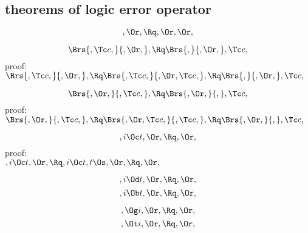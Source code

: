 \subsection{theorems of logic error operator}

\[, \Or, \Rq , \Or, \Or,\]


\[\Brs{,\Tc c,}{,\Or,} , \Rq \Brs{,}{,\Or,},\Tc c,\]
\bigskip
proof:\\
\begin{math} 
 \Brs{,\Tc c,}{,\Or,} ,\\\\
\Rq \Brs{,\Tc c,}{,\Or,\Tc c,} , \\\\
\Rq \Brs{,}{,\Or,} ,\Tc c,
\end{math}
\bigskip



\[\Brs{,\Or,}{,\Tc c,}, \Rq \Brs{,\Or,}{,},\Tc c,\]
proof:\\
\begin{math} 
    \Brs{,\Or,}{,\Tc c,},
\Rq \Brs{,\Or,\Tc c,}{,\Tc c,} , \\\\
\Rq \Brs{,\Or,} {,},\Tc c,
\end{math}
\bigskip

\[,i \Oc t, \Or, \Rq ,\Or,\]
\bigskip
proof:\\
\begin{math} 
,i \Oc t, \Or,\\\\
\Rq ,i \Oc t,  t \Os, \Or, \\\\
\Rq ,\Or,
\end{math}
\bigskip


\[,i \Od t, \Or, \Rq ,\Or,\]
\[,i \Ob t, \Or, \Rq ,\Or,\]

\[, \Og i, \Or, \Rq ,\Or,\]
\[, \Ot i, \Or, \Rq ,\Or,\]



\newpage


